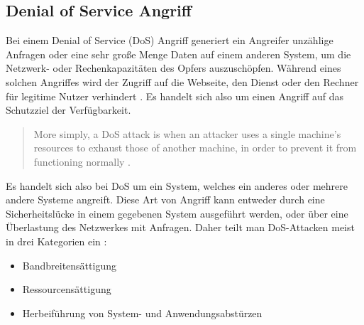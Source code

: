 \documentclass[a4paper]{book}
\begin{document}
\begin{large}
\begin{onehalfspace}
\subsection{Denial of Service Angriff}
\label{dos}
Bei einem \glqq Denial of Service (DoS)\grqq{} Angriff generiert ein Angreifer unzählige Anfragen oder eine sehr große Menge Daten auf einem anderen System, um die Netzwerk- oder \mbox Rechenkapazitäten des Opfers auszuschöpfen. Während eines solchen Angriffes wird der Zugriff auf die Webseite, den Dienst oder den Rechner für legitime Nutzer verhindert \cite{radware.2015} \cite[p.~217]{Fischer.2011}. Es handelt sich also um einen Angriff auf das Schutzziel der Verfügbarkeit.

\begin{quote}
\grqq More simply, a DoS attack is when an attacker uses a single machine’s resources to exhaust those of another machine, in order to prevent it from functioning normally \cite{radware.2015}.\grqq
\end{quote}

\noindent Es handelt sich also bei DoS um ein System, welches ein anderes oder mehrere andere Systeme angreift. Diese Art von Angriff kann entweder durch eine Sicherheitslücke in einem gegebenen System ausgeführt werden, oder über eine Überlastung des Netzwerkes mit Anfragen. Daher teilt man DoS-Attacken meist in drei Kategorien ein \cite{StefanoAlbrecht.2005}:
\end{onehalfspace}

\begin{itemize}
 \item Bandbreitensättigung
 \item Ressourcensättigung
 \item Herbeiführung von System- und Anwendungsabstürzen
\end{itemize}

\begin{onehalfspace}


\end{onehalfspace}
\end{large}
\end{document}
